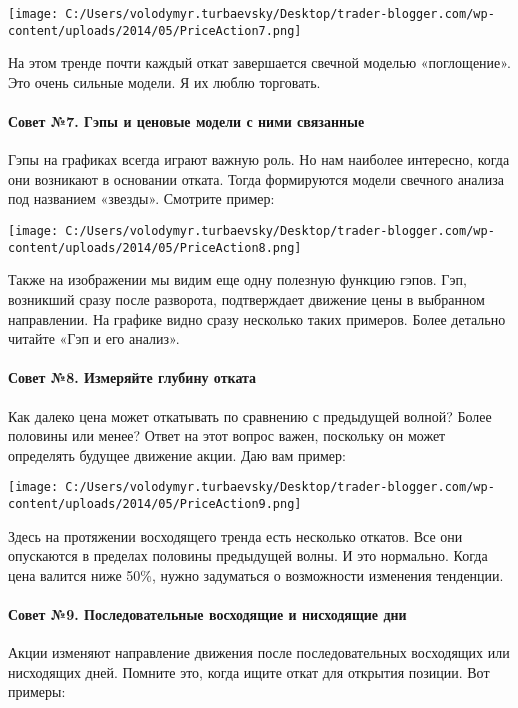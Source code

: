 \documentclass[a5paper]{article}
\begin{document}
\texttt{[image: C:/Users/volodymyr.turbaevsky/Desktop/trader-blogger.com/wp-content/uploads/2014/05/PriceAction7.png]}

На этом тренде почти каждый откат завершается свечной моделью «поглощение». Это очень сильные модели. Я их люблю торговать.

\paragraph{Совет №7. Гэпы и ценовые модели с ними связанные}

Гэпы на графиках всегда играют важную роль. Но нам наиболее интересно,
когда они возникают в основании отката. Тогда формируются модели
свечного анализа под названием «звезды». Смотрите пример:

\texttt{[image: C:/Users/volodymyr.turbaevsky/Desktop/trader-blogger.com/wp-content/uploads/2014/05/PriceAction8.png]}

Также на изображении мы видим еще одну полезную функцию гэпов. Гэп,
возникший сразу после разворота, подтверждает движение цены в
выбранном направлении. На графике видно сразу несколько таких
примеров. Более детально читайте «Гэп и его анализ».

\paragraph{Совет №8. Измеряйте глубину отката}

Как далеко цена может откатывать по сравнению с предыдущей волной?
Более половины или менее? Ответ на этот вопрос важен, поскольку он
может определять будущее движение акции. Даю вам пример:

\texttt{[image: C:/Users/volodymyr.turbaevsky/Desktop/trader-blogger.com/wp-content/uploads/2014/05/PriceAction9.png]}

Здесь на протяжении восходящего тренда есть несколько откатов. Все они опускаются в пределах половины предыдущей волны. И это нормально. Когда цена валится ниже 50\%, нужно задуматься о возможности изменения тенденции.

\paragraph{Совет №9. Последовательные восходящие и нисходящие дни}

Акции изменяют направление движения после последовательных восходящих
или нисходящих дней. Помните это, когда ищите откат для открытия
позиции. Вот примеры:
\end{document}
